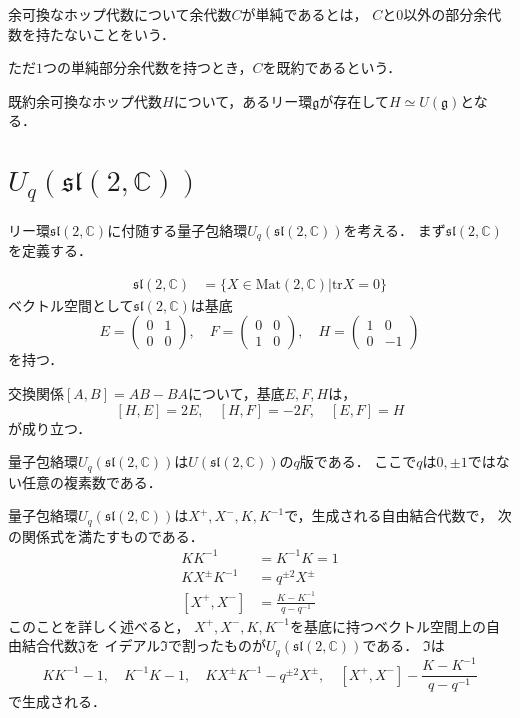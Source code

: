 \documentclass[dvipdfm]{beamer}
\newcommand{\CC}{\mathbb{C}}
\begin{document}
  \begin{frame}
    余可換なホップ代数について余代数$C$が単純であるとは，
    $C$と$0$以外の部分余代数を持たないことをいう．

    ただ$1$つの単純部分余代数を持つとき，$C$を既約であるという．
    \begin{theorem}
      既約余可換なホップ代数$H$について，あるリー環$\mathfrak{g}$が存在して$H\simeq U(\mathfrak{g})$となる．
    \end{theorem}
  \end{frame}
  \section{$U_q(\mathfrak{sl}(2,\CC))$}
  \begin{frame}
    リー環$\mathfrak{sl}(2,\CC)$に付随する量子包絡環$U_q(\mathfrak{sl}(2,\CC))$を考える．
    まず$\mathfrak{sl}(2,\CC)$を定義する．
    \begin{definition}
      \begin{align*}
        \mathfrak{sl}(2,\CC) &= \{X \in \text{Mat}(2,\CC) | \text{tr} X = 0\}
      \end{align*}
      ベクトル空間として$\mathfrak{sl}(2,\CC)$は基底
      \[
      E=\begin{pmatrix} 0 & 1 \\ 0 & 0 \end{pmatrix},\quad F=\begin{pmatrix} 0 & 0 \\ 1 & 0 \end{pmatrix},\quad H=\begin{pmatrix} 1 & 0 \\ 0 & -1 \end{pmatrix}
      \]
      を持つ．
    \end{definition}
    交換関係$[A,B]=AB-BA$について，基底$E,F,H$は，
    \[
    [H,E]=2E,\quad [H,F]=-2F,\quad [E,F]=H
    \]
    が成り立つ．
  \end{frame}
  \begin{frame}
    量子包絡環$U_q(\mathfrak{sl}(2,\CC))$は$U(\mathfrak{sl}(2,\CC))$の$q$版である．
    ここで$q$は$0,\pm1$ではない任意の複素数である．

    量子包絡環$U_q(\mathfrak{sl}(2,\CC))$は$X^+,X^-,K,K^{-1}$で，生成される自由結合代数で，
    次の関係式を満たすものである．
    \begin{align*}
      KK^{-1} &= K^{-1}K = 1\\
      KX^{\pm}K^{-1} &= q^{\pm2}X^{\pm}\\
      [X^+,X^-] &= \frac{K-K^{-1}}{q-q^{-1}}
    \end{align*}
    このことを詳しく述べると，
    $X^+,X^-,K,K^{-1}$を基底に持つベクトル空間上の自由結合代数$\mathfrak{J}$を
    イデアル$\mathfrak{I}$で割ったものが$U_q(\mathfrak{sl}(2,\CC))$である．
    $\mathfrak{I}$は
    \[
    KK^{-1}-1,\quad K^{-1}K-1,\quad KX^{\pm}K^{-1}-q^{\pm2}X^{\pm},\quad [X^+,X^-]-\frac{K-K^{-1}}{q-q^{-1}}
    \]
    で生成される．
  \end{frame}
\end{document}
